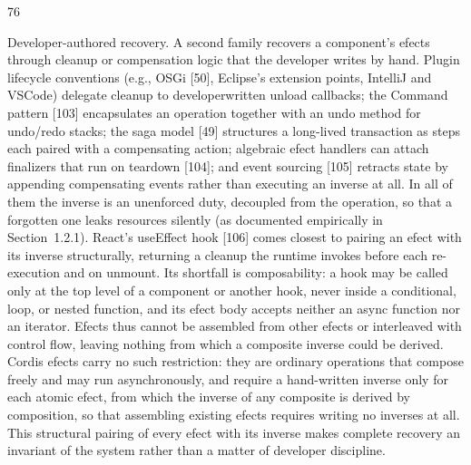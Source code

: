 \documentclass[
  10
]{article}
\begin{document}
76

Developer-authored recovery. A second family recovers a component's
efects through cleanup or compensation logic that the developer writes
by hand. Plugin lifecycle conventions (e.g., OSGi {[}50{]}, Eclipse's
extension points, IntelliJ and VSCode) delegate cleanup to
developerwritten unload callbacks; the Command pattern {[}103{]}
encapsulates an operation together with an undo method for undo/redo
stacks; the saga model {[}49{]} structures a long-lived transaction as
steps each paired with a compensating action; algebraic efect handlers
can attach finalizers that run on teardown {[}104{]}; and event sourcing
{[}105{]} retracts state by appending compensating events rather than
executing an inverse at all. In all of them the inverse is an unenforced
duty, decoupled from the operation, so that a forgotten one leaks
resources silently (as documented empirically in Section~1.2.1). React's
useEffect hook {[}106{]} comes closest to pairing an efect with its
inverse structurally, returning a cleanup the runtime invokes before
each re-execution and on unmount. Its shortfall is composability: a hook
may be called only at the top level of a component or another hook,
never inside a conditional, loop, or nested function, and its efect body
accepts neither an async function nor an iterator. Efects thus cannot be
assembled from other efects or interleaved with control flow, leaving
nothing from which a composite inverse could be derived. Cordis efects
carry no such restriction: they are ordinary operations that compose
freely and may run asynchronously, and require a hand-written inverse
only for each atomic efect, from which the inverse of any composite is
derived by composition, so that assembling existing efects requires
writing no inverses at all. This structural pairing of every efect with
its inverse makes complete recovery an invariant of the system rather
than a matter of developer discipline.
\end{document}
